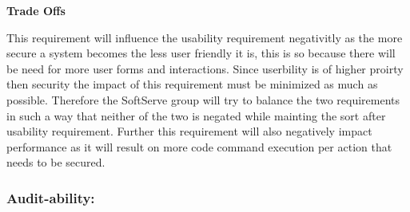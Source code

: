 \begin{flushleft}
%

\textbf{Trade Offs}

This requirement will influence the usability requirement negativitly as  the more secure a system becomes the less user friendly it is, this is so because there will be need for more user forms and interactions. Since userbility is of higher proirty then security the impact of this requirement must be minimized as much as possible. Therefore the SoftServe group will try to balance the two requirements in such a way that neither of the two is negated while mainting the sort after usability requirement. Further this requirement will also negatively impact performance as it will result on more code command execution per action that needs to be secured.
\end{flushleft}

\vspace{0.1in}

\subsubsection{Audit-ability:}

